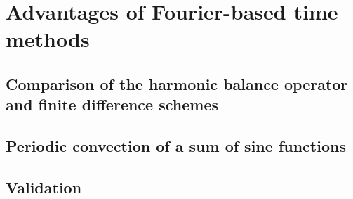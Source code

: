 \chapter{Advantages of Fourier-based time methods}
\label{cha:advantages}

\chabstract{}

\minitoc
\newpage


\section{Comparison of the harmonic balance operator and finite difference schemes}
\label{sec:hb_operator}


\section{Periodic convection of a sum of sine functions}
\label{sec:sum_sine}


\section{Validation}
\label{sec:channel_multifreq}


\chconclu{}
